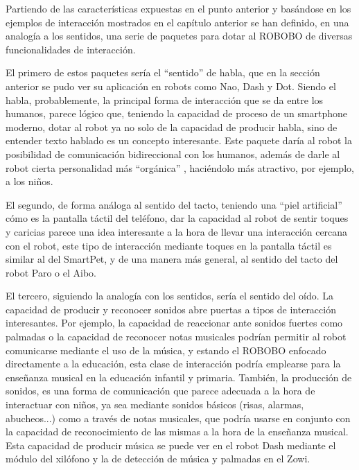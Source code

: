  
 Partiendo de las características expuestas en el punto anterior y basándose en los ejemplos de interacción mostrados en el capítulo anterior se han definido, en una analogía a los sentidos, una serie de paquetes para dotar al ROBOBO de diversas funcionalidades de interacción.
 
 El primero de estos paquetes sería el \enquote{sentido} de habla, que en la sección anterior se pudo ver su aplicación en robots como Nao, Dash y Dot. Siendo el habla, probablemente, la principal forma de interacción que se da entre los humanos, parece lógico que, teniendo la capacidad de proceso de un smartphone moderno, dotar al robot ya no solo de la capacidad de producir habla, sino de entender texto hablado es un concepto interesante. Este paquete daría al robot la posibilidad de comunicación bidireccional con los humanos, además de darle al robot cierta personalidad más \enquote{orgánica} , haciéndolo más atractivo, por ejemplo, a los niños.
 
 El segundo, de forma análoga al sentido del tacto, teniendo una \enquote{piel artificial} cómo es la pantalla táctil del teléfono, dar la capacidad al robot de sentir toques y caricias parece una idea interesante a la hora de llevar una interacción cercana con el robot, este tipo de interacción mediante toques en la pantalla táctil es similar al del SmartPet, y de una manera más general, al sentido del tacto del robot Paro o el Aibo.
 
 El tercero, siguiendo la analogía con los sentidos, sería el sentido del oído. La capacidad de producir y reconocer sonidos abre puertas a tipos de interacción interesantes. Por ejemplo, la capacidad de reaccionar ante sonidos fuertes como palmadas o la capacidad de reconocer notas musicales podrían permitir al robot comunicarse mediante el uso de la música, y estando el ROBOBO enfocado directamente a la educación, esta clase de interacción podría emplearse para la enseñanza musical en la educación infantil y primaria. También, la producción de sonidos, es una forma de comunicación que parece adecuada a la hora de interactuar con niños, ya sea mediante sonidos básicos (risas, alarmas, abucheos...)  como a través de notas musicales, que podría usarse en conjunto con la capacidad de reconocimiento de las mismas a la hora de la enseñanza musical. Esta capacidad de producir música se puede ver en el robot Dash mediante el módulo del xilófono y la de detección de música y palmadas en el Zowi.
 
